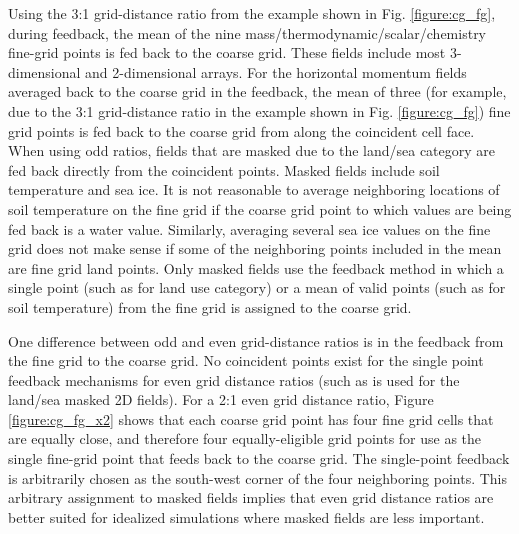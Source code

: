 Using the 3:1 grid-distance ratio
from the example shown in Fig. \ref{figure:cg_fg},
during feedback, the mean of the nine mass/thermodynamic/scalar/chemistry fine-grid 
points is fed back to the coarse grid.
These fields include most 3-dimensional and 2-dimensional arrays.  
For the horizontal momentum fields averaged back to the coarse grid in the 
feedback, the mean of three (for example, due to the 3:1 grid-distance ratio
in the example shown in Fig. \ref{figure:cg_fg}) fine grid
points is fed back to the coarse grid from along the coincident cell face.
When using odd ratios, fields that are masked due 
to the land/sea category are fed back directly from the coincident points.  
Masked fields include soil temperature and sea ice.  It is not reasonable 
to average neighboring locations of soil temperature on the fine grid 
if the coarse grid point to which values are being fed back is a water value.  Similarly, averaging
several sea ice values on the fine grid does not make sense if some of the neighboring
points included in the mean are fine grid land points. 
Only masked fields use the feedback method in which a single
point (such as for land use category) or a mean of valid points
(such as for soil temperature) from the fine grid is assigned to the coarse grid.

One difference between odd and even grid-distance ratios 
is in the feedback from the fine grid to the coarse grid.  No 
coincident points exist for the single point feedback mechanisms
for even grid distance ratios
(such as is used for the land/sea masked 2D fields).  
For a 2:1 even grid distance ratio, Figure
\ref{figure:cg_fg_x2} shows that each coarse 
grid point has four fine grid cells that are equally close,
and therefore four equally-eligible grid points for use as the 
single fine-grid point that feeds back to the coarse grid.  The 
single-point feedback is arbitrarily chosen as the south-west 
corner of the four neighboring points.
This arbitrary assignment to masked fields implies that even
grid distance ratios are better suited for idealized simulations
where masked fields are less important.



